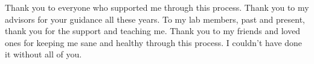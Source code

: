 Thank you to everyone who supported me through this process. Thank you to my
advisors for your guidance all these years. To my lab members, past and
present, thank you for the support and teaching me. Thank you to my friends and
loved ones for keeping me sane and healthy through this process. I couldn't
have done it without all of you.
